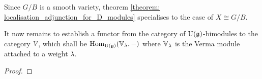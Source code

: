             \begin{corollary}
                Since $G/B$ is a smooth variety, theorem \ref{theorem: localisation_adjunction_for_D_modules} specialises to the case of $X \cong G/B$.
            \end{corollary}
            
            It now remains to establish a functor from the category of $\mathrm{U}(\mathfrak{g})$-bimodules to the category $\mathcal{V}$, which shall be $\mathrm{Hom}_{\mathrm{U}(\mathfrak{g})}(\mathbb{V}_{\lambda}, -)$ where $\mathbb{V}_{\lambda}$ is the Verma module attached to a weight $\lambda$. 
            \begin{theorem} \label{theorem: beilinson_bernstein_localisation}
                
            \end{theorem}
                \begin{proof}
                    
                \end{proof}
            \begin{corollary} \label{coro: borel_weil_bott_theorem}
                
            \end{corollary}